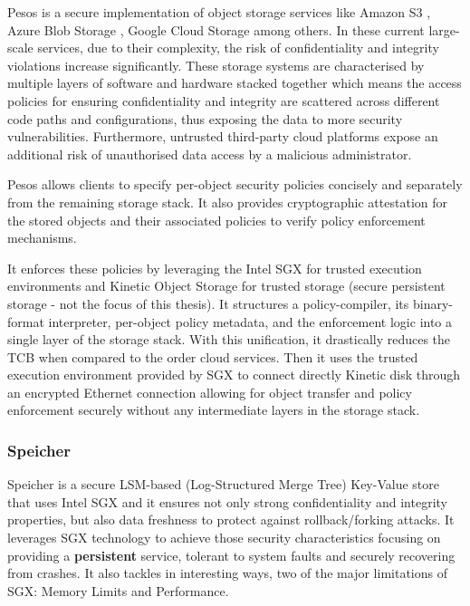 Pesos \cite{pesos:1} is a secure implementation of object storage services like Amazon S3 \cite{s3:1}, Azure Blob Storage \cite{azureStorage:1}, Google Cloud Storage \cite{googleStorage:1} among others. In these current large-scale services, due to their complexity, the risk of confidentiality and integrity violations increase significantly. These storage systems are characterised by multiple layers of software and hardware stacked together which means the access policies for ensuring confidentiality and integrity are scattered across different code paths and configurations, thus exposing the data to more security vulnerabilities. Furthermore, untrusted third-party cloud platforms expose an additional risk of unauthorised data access by a malicious administrator.

Pesos allows clients to specify per-object security policies concisely and separately from the remaining storage stack. It also provides cryptographic attestation for the stored objects and their associated policies to verify policy enforcement mechanisms.

It enforces these policies by leveraging the Intel \gls{SGX} for trusted execution environments and Kinetic Object Storage \cite{kinetic:1} for trusted storage (secure persistent storage - not the focus of this thesis). It structures a policy-compiler, its binary-format interpreter, per-object policy metadata, and the enforcement logic into a single layer of the storage stack. With this unification, it drastically reduces the \gls{TCB} when compared to the order cloud services. Then it uses the trusted execution environment provided by \gls{SGX} to connect directly Kinetic disk through an encrypted Ethernet connection allowing for object transfer and policy enforcement securely without any intermediate layers in the storage stack.

\subsubsection{Speicher}
\label{sssec:speicher}

Speicher \cite{speicher:1} is a secure \gls{LSM}-based (Log-Structured Merge Tree) Key-Value store that uses Intel \gls{SGX} and it ensures not only strong confidentiality and integrity properties, but also data freshness to protect against rollback/forking attacks. It leverages \gls{SGX} technology to achieve those security characteristics focusing on providing a \textbf{persistent} service, tolerant to system faults and securely recovering from crashes. It also tackles in interesting ways, two of the major limitations of \gls{SGX}: Memory Limits and Performance.

